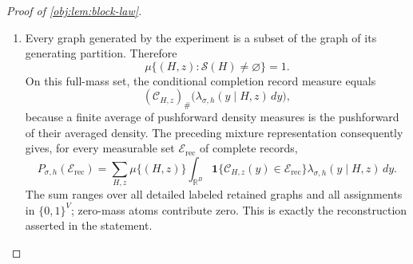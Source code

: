 \begin{proof}[Proof of \cref{obj:lem:block-law}]
\begin{enumerate}
For the partition associated with \(g\), split the source-sign sum into revealed and hidden labels:
\[
\sum_{j\in S'_\ell}(2z_j-1)
=A_\ell+2k_\ell(g)-u_\ell.
\]
Since \(|S'_\ell|=d\), its response shift reduces to
\[
\delta_\ell(S',z)
=\frac{\sigma h}{2d}
\bigl(A_\ell+2k_\ell(g)-u_\ell\bigr).
\]
Thus its product response density depends on the completion through \(k(g)\). Regrouping the uniform completion average by these fibers gives
\[
\lambda_{\sigma,h}(y\mid H,z)
=
\frac1{\binom{M}{K}}
\sum_{\substack{0\le k_\ell\le u_\ell\\
\sum_{\ell=1}^{B}k_\ell=K}}
\prod_{\ell=1}^{B}
\binom{u_\ell}{k_\ell}
f\!\left(
y_\ell-\frac{\sigma h(A_\ell+2k_\ell-u_\ell)}{2d}
\right).
\]
Each translated product density integrates to one, and the fiber weights sum to one because the fibers partition \(\mathcal G(H)\). Hence this is a probability density.

Let \(x\) be a polynomial indeterminate, and let \([x^K]\) denote extraction of its degree-\(K\) coefficient. Expanding the finite product selects exactly the vectors whose coordinates sum to \(K\), so
\[
\lambda_{\sigma,h}(y\mid H,z)
=
\frac{
[x^K]\displaystyle\prod_{\ell=1}^{B}
\left\{
\sum_{k=0}^{u_\ell}
\binom{u_\ell}{k}
f\!\left(y_\ell-\frac{\sigma h(A_\ell+2k-u_\ell)}{2d}\right)x^k
\right\}
}{
\binom{M}{K}
}.
\]
This proves the stated density by averaging the translated baseline densities over the original labeled completions. %

\item Every graph generated by the experiment is a subset of the graph of its generating partition. Therefore
\[
\mu\{(H,z):\mathcal S(H)\ne\varnothing\}=1.
\]
On this full-mass set, the conditional completion record measure equals
\[
(\mathcal C_{H,z})_{\#}
\bigl(\lambda_{\sigma,h}(y\mid H,z)\,dy\bigr),
\]
because a finite average of pushforward density measures is the pushforward of their averaged density. The preceding mixture representation consequently gives, for every measurable set \(\mathcal E_{\mathrm{rec}}\) of complete records,
\[
P_{\sigma,h}(\mathcal E_{\mathrm{rec}})
=
\sum_{H,z}\mu\{(H,z)\}
\int_{\mathbb R^B}
\mathbf1\{\mathcal C_{H,z}(y)\in\mathcal E_{\mathrm{rec}}\}
\lambda_{\sigma,h}(y\mid H,z)\,dy.
\]
The sum ranges over all detailed labeled retained graphs and all assignments in \(\{0,1\}^{V}\); zero-mass atoms contribute zero. This is exactly the reconstruction asserted in the statement. %


\end{enumerate}
\end{proof}
